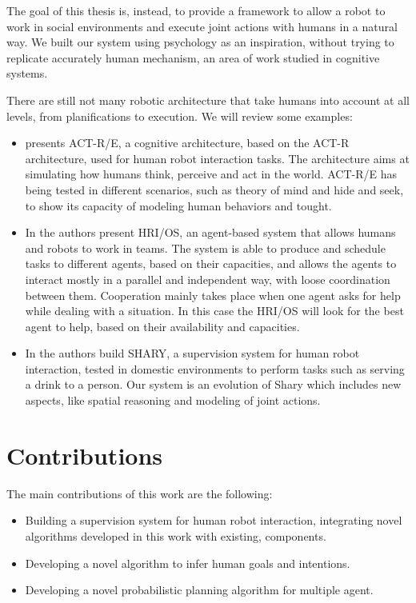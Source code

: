 The goal of this thesis is, instead, to provide a framework to allow a robot to work in social environments and execute joint actions with humans in a natural way. We built our system using psychology as an inspiration, without trying to replicate accurately human mechanism, an area of work studied in cognitive systems. 

There are still not many robotic architecture that take humans into account at all levels, from planifications to execution. We will review some examples:
\begin{itemize} 
\item \cite{trafton2013act} presents ACT-R/E, a cognitive architecture, based
on the ACT-R architecture, used for human robot interaction tasks. The
architecture aims at simulating how humans think, perceive and act in
the world. ACT-R/E has being tested in different scenarios, such as
theory of mind and hide and seek, to show its capacity of modeling
human behaviors and tought.
\item In \cite{Fong_2006} the authors present  HRI/OS, an agent-based system
that allows humans and robots to work in teams. The system is able to
produce and schedule tasks to different agents, based on their capacities,
and allows the agents to interact mostly in a parallel and independent way, with
loose coordination between them. Cooperation  mainly
takes place when one agent asks for help while
dealing with a situation. In this case the HRI/OS will
look for the best agent to help, based on their availability and capacities.

\item In \cite{clodic2009shary} the authors build SHARY, a supervision
system for human robot interaction, tested in domestic environments to
perform tasks such as serving a drink to a person. Our system is an
evolution of Shary which includes new aspects, like spatial
reasoning and modeling of joint actions.
\end{itemize}

\section{Contributions}

The main contributions of this work are the following:
\begin{itemize}
\item Building a supervision system for human robot interaction, integrating novel algorithms developed in this work with existing, components.
\item Developing a novel algorithm to infer human goals and intentions.
\item Developing a novel probabilistic planning algorithm for multiple agent.
\end{itemize}

